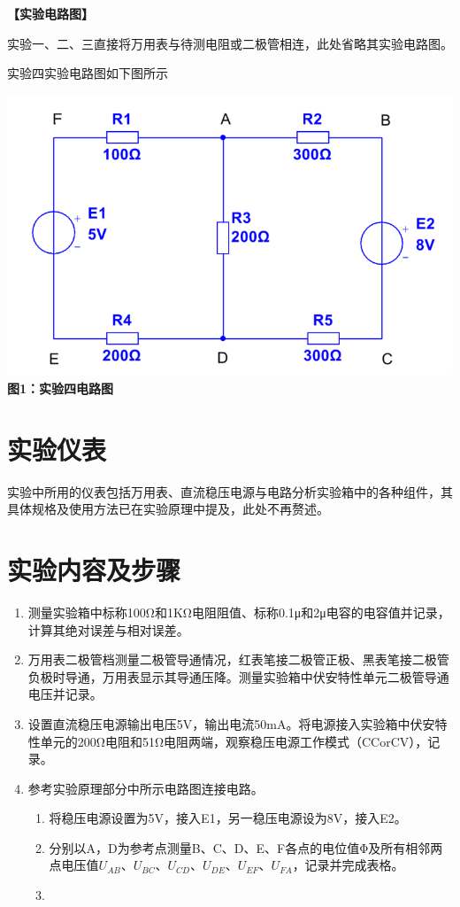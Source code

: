 \documentclass[a4paper]{article}
\begin{document}
\begin{flushleft}
    \bfseries{}\songti 【实验电路图】
\end{flushleft}\par
实验一、二、三直接将万用表与待测电阻或二极管相连，此处省略其实验电路图。\par
实验四实验电路图如下图所示
\begin{center}
    \includegraphics*{1.url}\\
    \bfseries{}\songti 图1：实验四电路图
\end{center}

\section{实验仪表}
实验中所用的仪表包括万用表、直流稳压电源与电路分析实验箱中的各种组件，其具体规格及使用方法已在实验原理中提及，此处不再赘述。

\section{实验内容及步骤}
\begin{enumerate}
    \item 测量实验箱中标称100Ω和1KΩ电阻阻值、标称0.1μ和2μ电容的电容值并记录，计算其绝对误差与相对误差。
    \item 万用表二极管档测量二极管导通情况，红表笔接二极管正极、黑表笔接二极管负极时导通，万用表显示其导通压降。测量实验箱中伏安特性单元二极管导通电压并记录。
    \item 设置直流稳压电源输出电压5V，输出电流50mA。将电源接入实验箱中伏安特性单元的200Ω电阻和51Ω电阻两端，观察稳压电源工作模式（CCorCV），记录。
    \item 参考实验原理部分中所示电路图连接电路。
    \begin{enumerate}
        \item 将稳压电源设置为5V，接入E1，另一稳压电源设为8V，接入E2。
        \item 分别以A，D为参考点测量B、C、D、E、F各点的电位值Φ及所有相邻两点电压值$ U_{AB} $、$ U_{BC} $、$ U_{CD} $、$ U_{DE} $、$ U_{EF} $、$ U_{FA} $，记录并完成表格。
        \item 
    \end{enumerate}
\end{enumerate}
\newpage
\end{document}

